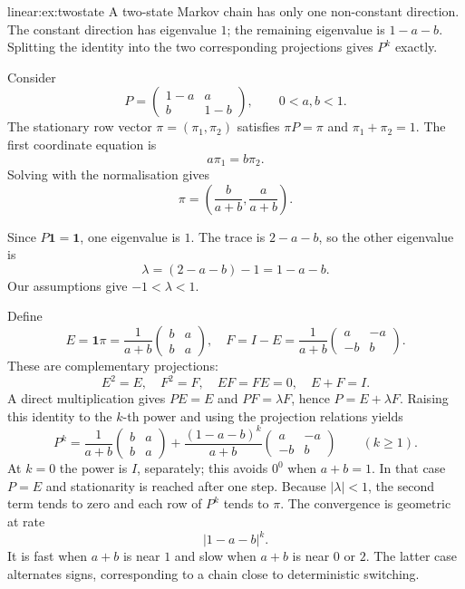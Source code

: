 \begin{solution}{linear:ex:twostate}
\idea A two-state Markov chain has only one non-constant direction. The constant direction has eigenvalue $1$; the remaining eigenvalue is $1-a-b$. Splitting the identity into the two corresponding projections gives $P^k$ exactly.

\writeup Consider
\[
P=\begin{pmatrix}1-a&a\\b&1-b\end{pmatrix},
\qquad0<a,b<1.
\]
The stationary row vector $\pi=(\pi_1,\pi_2)$ satisfies $\pi P=\pi$ and $\pi_1+\pi_2=1$. The first coordinate equation is
\[
a\pi_1=b\pi_2.
\]
Solving with the normalisation gives
\[
\boxed{\pi=\left(\frac b{a+b},\frac a{a+b}\right)}.
\]

Since $P\mathbf1=\mathbf1$, one eigenvalue is $1$. The trace is $2-a-b$, so the other eigenvalue is
\[
\lambda=(2-a-b)-1=1-a-b.
\]
Our assumptions give $-1<\lambda<1$.

Define
\[
E=\mathbf1\pi=
\frac1{a+b}\begin{pmatrix}b&a\\b&a\end{pmatrix},
\quad
F=I-E=\frac1{a+b}\begin{pmatrix}a&-a\\-b&b\end{pmatrix}.
\]
These are complementary projections:
\[
E^2=E,\quad F^2=F,\quad EF=FE=0,\quad E+F=I.
\]
A direct multiplication gives $PE=E$ and $PF=\lambda F$, hence $P=E+\lambda F$. Raising this identity to the $k$-th power and using the projection relations yields
\[
\boxed{P^k=
\frac1{a+b}\begin{pmatrix}b&a\\b&a\end{pmatrix}
+\frac{(1-a-b)^k}{a+b}
\begin{pmatrix}a&-a\\-b&b\end{pmatrix}}
\qquad(k\ge1).
\]
At $k=0$ the power is $I$, separately; this avoids $0^0$ when $a+b=1$.
In that case $P=E$ and stationarity is reached after one step.
Because $|\lambda|<1$, the second term tends to zero and each row of $P^k$ tends to $\pi$. The convergence is geometric at rate
\[
\boxed{|1-a-b|^k}.
\]
It is fast when $a+b$ is near $1$ and slow when $a+b$ is near $0$ or $2$. The latter case alternates signs, corresponding to a chain close to deterministic switching.
\end{solution}

